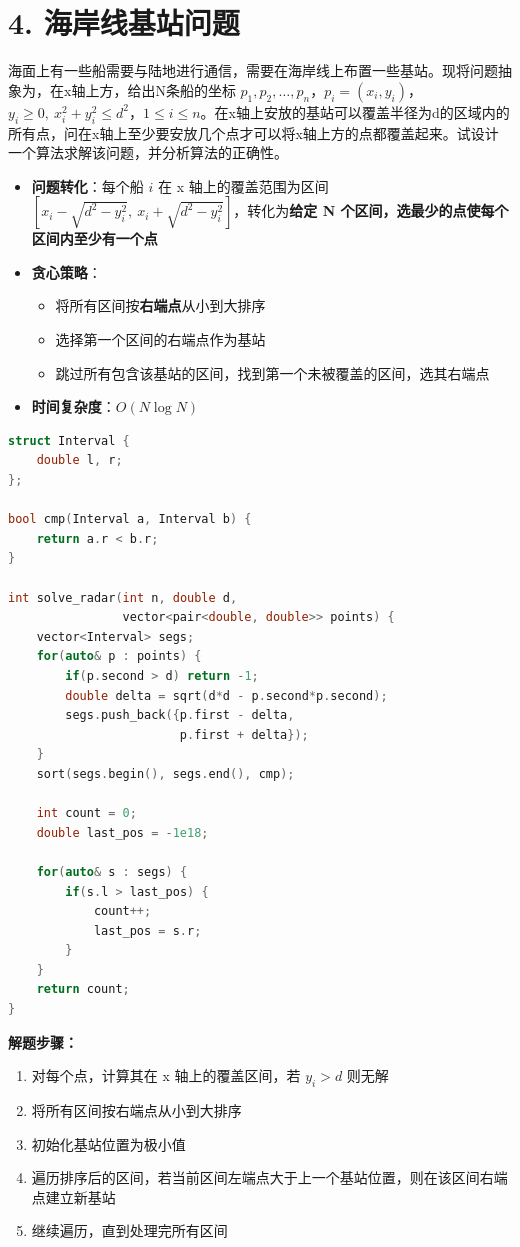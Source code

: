 \section*{4. 海岸线基站问题}

海面上有一些船需要与陆地进行通信，需要在海岸线上布置一些基站。现将问题抽象为，在x轴上方，给出N条船的坐标 $p_1, p_2, \ldots, p_n$，$p_i = (x_i, y_i)$，$y_i \ge 0, \ x_i^2 + y_i^2 \le d^2$，$1 \le i \le n$。在x轴上安放的基站可以覆盖半径为d的区域内的所有点，问在x轴上至少要安放几个点才可以将x轴上方的点都覆盖起来。试设计一个算法求解该问题，并分析算法的正确性。

\begin{itemize}
    \item \textbf{问题转化}：每个船 $i$ 在 x 轴上的覆盖范围为区间 $[x_i - \sqrt{d^2-y_i^2}, \ x_i + \sqrt{d^2-y_i^2}]$，转化为\textbf{给定 N 个区间，选最少的点使每个区间内至少有一个点}
    \item \textbf{贪心策略}：
    \begin{itemize}
        \item 将所有区间按\textbf{右端点}从小到大排序
        \item 选择第一个区间的右端点作为基站
        \item 跳过所有包含该基站的区间，找到第一个未被覆盖的区间，选其右端点
    \end{itemize}
    \item \textbf{时间复杂度}：$O(N \log N)$
\end{itemize}

\begin{lstlisting}[language=C++, style=cppstyle]
struct Interval {
    double l, r;
};

bool cmp(Interval a, Interval b) {
    return a.r < b.r;
}

int solve_radar(int n, double d,
                vector<pair<double, double>> points) {
    vector<Interval> segs;
    for(auto& p : points) {
        if(p.second > d) return -1;
        double delta = sqrt(d*d - p.second*p.second);
        segs.push_back({p.first - delta,
                        p.first + delta});
    }
    sort(segs.begin(), segs.end(), cmp);

    int count = 0;
    double last_pos = -1e18;

    for(auto& s : segs) {
        if(s.l > last_pos) {
            count++;
            last_pos = s.r;
        }
    }
    return count;
}
\end{lstlisting}

\textbf{解题步骤：}
\begin{enumerate}
    \item 对每个点，计算其在 x 轴上的覆盖区间，若 $y_i > d$ 则无解
    \item 将所有区间按右端点从小到大排序
    \item 初始化基站位置为极小值
    \item 遍历排序后的区间，若当前区间左端点大于上一个基站位置，则在该区间右端点建立新基站
    \item 继续遍历，直到处理完所有区间
\end{enumerate}
